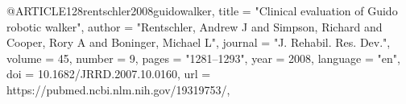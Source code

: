 @ARTICLE{128rentschler2008guidowalker,
title    = "Clinical evaluation of Guido robotic walker",
author   = "Rentschler, Andrew J and Simpson, Richard and Cooper, Rory A and
Boninger, Michael L",
journal  = "J. Rehabil. Res. Dev.",
volume   =  45,
number   =  9,
pages    = "1281--1293",
year     =  2008,
language = "en",
doi      = {10.1682/JRRD.2007.10.0160},
url      = {https://pubmed.ncbi.nlm.nih.gov/19319753/},
}
